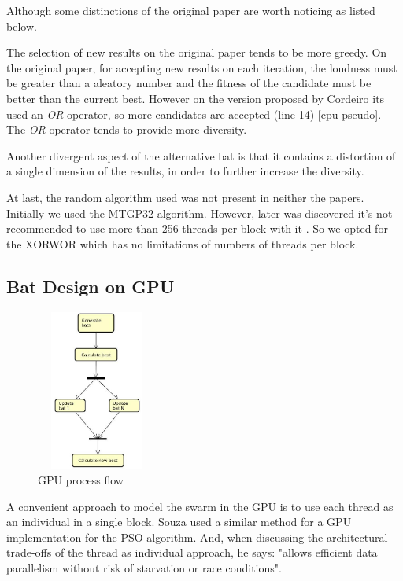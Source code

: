 \documentclass[conference]{IEEEtran}
\begin{document}
Although some distinctions of the original paper are worth noticing as listed below.

The selection of new results on the original paper tends to be more
greedy. On the original paper, for accepting new results on each
iteration, the loudness must be greater than a aleatory number and the
fitness of the candidate must be better than the current best.
However on the version proposed by Cordeiro \cite{comparisonBatParpinelli} its used
an \textit{OR} operator, so more candidates are accepted (line 14) \ref{cpu-pseudo}.
The \textit{OR} operator tends to provide more diversity.

Another divergent aspect of the alternative bat is that
it contains a distortion of a single dimension of the results, in order 
to further increase the diversity.

At last, the random algorithm used was not present in neither the
papers. Initially we used the MTGP32 algorithm. However, later was
discovered it's not recommended to use more than 256 threads per block
with it \cite{curandIssue}. So we opted for the XORWOR which has no
limitations of numbers of threads per block.


\subsection{Bat Design on GPU}

\begin{figure}[H]
    \begin{center}
    \includegraphics[width=150px,height=200px]{activity}
    \end{center}
    \caption{GPU process flow}
\end{figure}

A convenient approach to model the swarm in the GPU is to use each
thread as an individual in a single block. Souza \cite{pso-gpu} used a similar method for
a GPU implementation for the PSO algorithm. And, when discussing the
architectural trade-offs of the thread as individual approach, he says:
"allows efficient data parallelism without risk of starvation or race
conditions".
\end{document}
